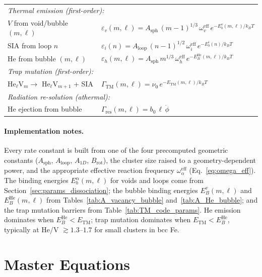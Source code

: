 \begin{table}[htbp]
\begin{tabular}{@{}p{3.8cm}l@{}}
\multicolumn{2}{l}{\emph{Thermal emission (first-order):}} \\
$V$ from void/bubble $(m,\ell)$
  & $\varepsilon_v(m,\ell) = A_{\mathrm{sph}}\,(m{-}1)^{1/3}\,\omega_v^{\mathrm{eff}}\,
    e^{-E_b^v(m,\ell)/k_BT}$ \\
SIA from loop $n$
  & $\varepsilon_i(n) = A_{\mathrm{loop}}\,(n{-}1)^{1/2}\,\omega_i^{\mathrm{eff}}\,
    e^{-E_b^i(n)/k_BT}$ \\
He from bubble $(m,\ell)$
  & $\varepsilon_h(m,\ell) = A_{\mathrm{sph}}\,m^{1/3}\,\omega_h^{\mathrm{eff}}\,
    e^{-E_B^{\mathrm{He}}(m,\ell)/k_BT}$ \\[3pt]

\multicolumn{2}{l}{\emph{Trap mutation (first-order):}} \\
He$_\ell$V$_m \to$ He$_\ell$V$_{m+1}$ + SIA
  & $\Gamma_{\mathrm{TM}}(m,\ell) = \nu_0\,e^{-E_{\mathrm{TM}}(m,\ell)/k_BT}$ \\[3pt]

\multicolumn{2}{l}{\emph{Radiation re-solution (athermal):}} \\
He ejection from bubble
  & $\Gamma_{\mathrm{res}}(m,\ell) = b_0\,\ell\,\dot{\phi}$ \\
\bottomrule
\end{tabular}
\end{table}

\paragraph{Implementation notes.}
Every rate constant is built from one of the four precomputed geometric
constants ($A_{\mathrm{sph}}$, $A_{\mathrm{loop}}$, $A_{1D}$,
$B_{\mathrm{rot}}$), the cluster size raised to a geometry-dependent power,
and the appropriate effective reaction frequency $\omega_\alpha^{\mathrm{eff}}$
(Eq.~\ref{eq:omega_eff}). The binding energies $E_b^\alpha(m,\ell)$ for voids
and loops come from Section~\ref{sec:params_dissociation}; the bubble binding
energies $E_B^v(m,\ell)$ and $E_B^{\mathrm{He}}(m,\ell)$ from
Tables~\ref{tab:A_vacancy_bubble} and~\ref{tab:A_He_bubble}; and the trap
mutation barriers from Table~\ref{tab:TM_code_params}. He emission dominates
when $E_B^{\mathrm{He}} < E_{\mathrm{TM}}$; trap mutation dominates when
$E_{\mathrm{TM}} < E_B^{\mathrm{He}}$, typically at He/V $\gtrsim 1.3$--$1.7$
for small clusters in bcc Fe.

\clearpage
\section{Master Equations}
\label{sec:rate_equations}

